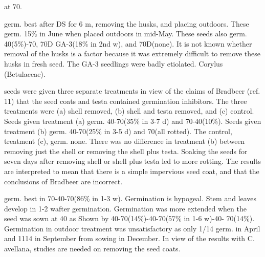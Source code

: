\begin{description}
at 70.
\item[C. spicata] germ. best after DS for 6 m, removing the husks, and placing
outdoors. These germ. 15\% in June when placed outdoors in mid-May. These seeds
also germ. 40(5\%)-70, 70D GA-3(18\% in 2nd w), and 70D(none). It is not known
whether removal of the husks is a factor because it was extremely difficult to remove
these husks in fresh seed. The GA-3 seedlings were badly etiolated.
Corylus (Betulaceae).
\item[C. avellana] seeds were given three separate treatments in view of the claims of
Bradbeer (ref. 11) that the seed coats and testa contained germination inhibitors. The
three treatments were (a) shell removed, (b) shell and testa removed, and (c) control.
Seeds given treatment (a) germ. 40-70(35\% in 3-7 d) and 70-40(10\%). Seeds given
treatment (b) germ. 40-70(25\% in 3-5 d) and 70(all rotted). The control, treatment (c),
germ. none. There was no difference in treatment (b) between removing just the shell
or removing the shell plus testa. Soaking the seeds for seven days after removing
shell or shell plus testa led to more rotting. The results are interpreted to mean that
there is a simple impervious seed coat, and that the conclusions of Bradbeer are
incorrect.
\item[C. comuta] germ. best in 70-40-70(86\% in 1-3 w). Germination is hypogeal.
Stem and leaves develop in 1-2 wafter germination. Germination was more extended
when the seed was sown at 40 as Shown by 40-70(14\%)-40-70(57\% in 1-6 w)-40-
70(14\%). Germination in outdoor treatment was unsatisfactory as only 1/14 germ. in
April and 1114 in September from sowing in December. In view of the results with C.
avellana, studies are needed on removing the seed coats.


\end{description}
